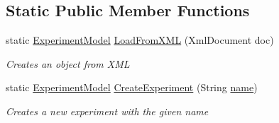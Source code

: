 \subsection*{Static Public Member Functions}
\begin{DoxyCompactItemize}
\item 
static \hyperlink{class_web_analyzer_1_1_models_1_1_base_1_1_experiment_model}{Experiment\+Model} \hyperlink{class_web_analyzer_1_1_models_1_1_base_1_1_experiment_model_a1ae79d69f4572920b709fa3f925ccf71}{Load\+From\+X\+M\+L} (Xml\+Document doc)
\begin{DoxyCompactList}\small\item\em Creates an object from X\+M\+L \end{DoxyCompactList}\item 
static \hyperlink{class_web_analyzer_1_1_models_1_1_base_1_1_experiment_model}{Experiment\+Model} \hyperlink{class_web_analyzer_1_1_models_1_1_base_1_1_experiment_model_a0e5b2b7b9b003ff62ace53c4fb2da8cf}{Create\+Experiment} (String \hyperlink{_u_i_2_h_t_m_l_resources_2js_2src_2create__experiment_8js_adac2bcb4f01b574cbc63fe8ee2c56bf0}{name})
\begin{DoxyCompactList}\small\item\em Creates a new experiment with the given name \end{DoxyCompactList}\end{DoxyCompactItemize}
